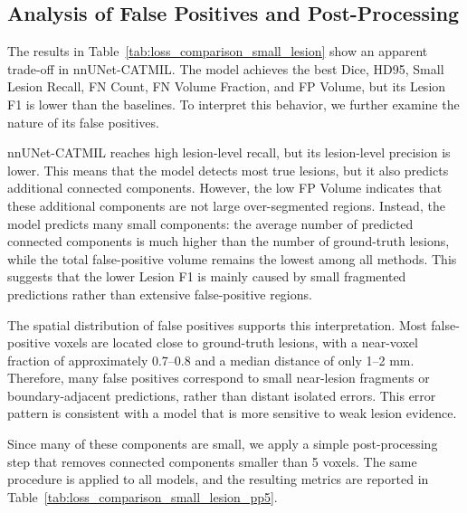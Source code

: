 \subsection{Analysis of False Positives and Post-Processing}

The results in Table~\ref{tab:loss_comparison_small_lesion} show an
apparent trade-off in nnUNet-CATMIL. The model achieves the best Dice,
HD95, Small Lesion Recall, FN Count, FN Volume Fraction, and FP Volume,
but its Lesion F1 is lower than the baselines. To interpret this behavior,
we further examine the nature of its false positives.

nnUNet-CATMIL reaches high lesion-level recall, but its lesion-level
precision is lower. This means that the model detects most true lesions,
but it also predicts additional connected components. However, the low FP
Volume indicates that these additional components are not large
over-segmented regions. Instead, the model predicts many small components:
the average number of predicted connected components is much higher than
the number of ground-truth lesions, while the total false-positive volume
remains the lowest among all methods. This suggests that the lower Lesion
F1 is mainly caused by small fragmented predictions rather than extensive
false-positive regions.

The spatial distribution of false positives supports this interpretation.
Most false-positive voxels are located close to ground-truth lesions, with
a near-voxel fraction of approximately 0.7--0.8 and a median distance of
only 1--2 mm. Therefore, many false positives correspond to small
near-lesion fragments or boundary-adjacent predictions, rather than
distant isolated errors. This error pattern is consistent with a model
that is more sensitive to weak lesion evidence.

Since many of these components are small, we apply a simple
post-processing step that removes connected components smaller than
5 voxels. The same procedure is applied to all models, and the resulting
metrics are reported in
Table~\ref{tab:loss_comparison_small_lesion_pp5}.

